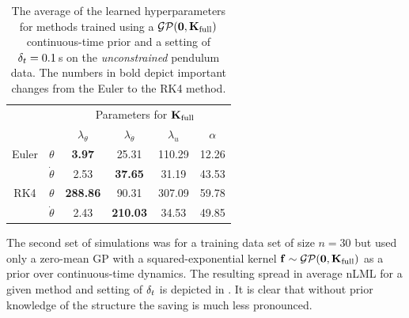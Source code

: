 \begin{table}
\renewcommand{\arraystretch}{1.3}
\begin{center}
\small
\begin{tabular}{ cc | ccc | c }
\toprule[1.5pt] 
&& \multicolumn{4}{c}{Parameters for $\mathbf{K}_{\text{full}}$} \\
&& $\lambda_{\theta}$ & $\lambda_{\dot\theta}$ & \multicolumn{1}{c}{ $\lambda_{u}$ } & $\alpha$ \\
\hline
%
Euler & $\theta$ &
{\bf3.97} & 25.31 & 110.29 & 12.26 \\
 & $\dot\theta$ &
2.53 & {\bf37.65} & 31.19 & 43.53 \\
\hline
%
RK4 & $\theta$ &
{\bf288.86} & 90.31 & 307.09 & 59.78 \\
 & $\dot\theta$ &
2.43 & {\bf210.03} & 34.53 & 49.85 \\
\bottomrule[1.5pt]
\end{tabular}
\end{center}
\caption{The average of the learned hyperparameters for methods trained using a $\mathcal{GP}(\mathbf{0},\mathbf{K}_{\text{full}})$ continuous-time prior and a setting of $\delta_t=0.1\,$s on the \textit{unconstrained} pendulum data. The numbers in bold depict important changes from the Euler to the RK4 method.}
\label{tab:hyps_SEdt04}
\end{table}





The second set of simulations was for a training data set of size $n=30$ but used only a zero-mean GP with a squared-exponential kernel $\mathbf{f} \sim \mathcal{GP}(\mathbf{0},\mathbf{K}_{\text{full}})$ as a prior over continuous-time dynamics. 
%
The resulting spread in average nLML for a given method and setting of $\delta_t$ is depicted in . It is clear that without prior knowledge of the structure the saving is much less pronounced.


